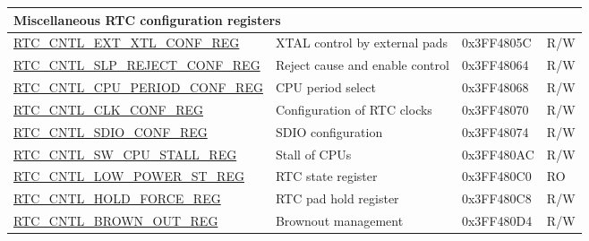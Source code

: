 \begin{longtable}{ | p{6.5cm} | p{6cm} | p{2cm} | p{1cm} | }
\multicolumn{4}{|l|}{\textbf{Miscellaneous RTC configuration registers}} \\ \hline
\hyperref[regdesc:RTCCNTLEXTXTLCONFREG]{RTC\_CNTL\_EXT\_XTL\_CONF\_REG} & XTAL control by external pads & 0x3FF4805C & R/W \\ \hline
\hyperref[regdesc:RTCCNTLSLPREJECTCONFREG]{RTC\_CNTL\_SLP\_REJECT\_CONF\_REG} & Reject cause and enable control & 0x3FF48064 & R/W \\ \hline
\hyperref[regdesc:RTCCNTLCPUPERIODCONFREG]{RTC\_CNTL\_CPU\_PERIOD\_CONF\_REG} & CPU period select & 0x3FF48068 & R/W \\ \hline
\hyperref[regdesc:RTCCNTLCLKCONFREG]{RTC\_CNTL\_CLK\_CONF\_REG} & Configuration of RTC clocks & 0x3FF48070 & R/W \\ \hline
\hyperref[regdesc:RTCCNTLSDIOCONFREG]{RTC\_CNTL\_SDIO\_CONF\_REG} & SDIO configuration & 0x3FF48074 & R/W \\ \hline
\hyperref[regdesc:RTCCNTLSWCPUSTALLREG]{RTC\_CNTL\_SW\_CPU\_STALL\_REG} & Stall of CPUs & 0x3FF480AC & R/W \\ \hline
\hyperref[regdesc:RTCCNTLLOWPOWERSTREG]{RTC\_CNTL\_LOW\_POWER\_ST\_REG} & RTC state register & 0x3FF480C0 & RO \\\hline
\hyperref[regdesc:RTCCNTLHOLDFORCEREG]{RTC\_CNTL\_HOLD\_FORCE\_REG} & RTC pad hold register & 0x3FF480C8 & R/W \\ \hline
\hyperref[regdesc:RTCCNTLBROWNOUTREG]{RTC\_CNTL\_BROWN\_OUT\_REG} & Brownout management & 0x3FF480D4 & R/W \\ \hline
\end{longtable}
